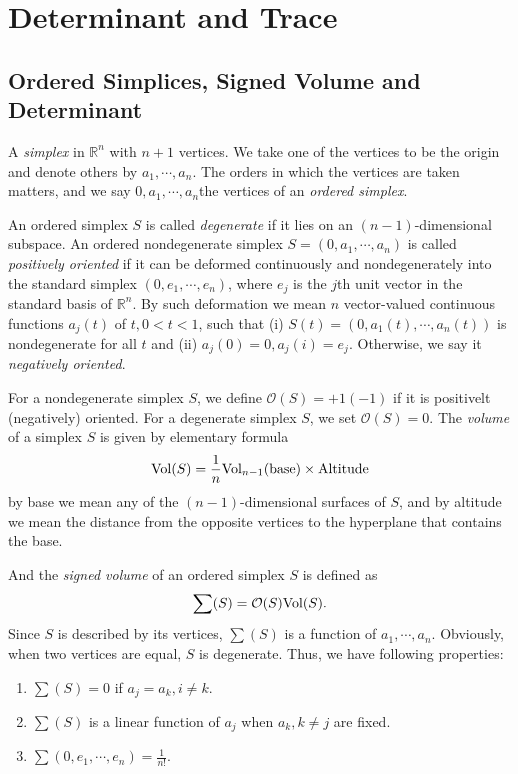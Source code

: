 \documentclass[11pt]{book}
\theoremstyle{definition}
\numberwithin{equation}{chapter}
\begin{document}
\chapter{Determinant and Trace}
\section{Ordered Simplices, Signed Volume and Determinant}
A \emph{simplex} in $\mathbb{R}^n$ with $n+1$ vertices. We take one of the vertices to be the origin and denote others by $a_1,\cdots, a_n$. The orders in which the vertices are taken matters, and we say $0, a_1,\cdots, a_n$the vertices of an \emph{ordered simplex}.

An ordered simplex $S$ is called \emph{degenerate} if it lies on an $(n-1)$-dimensional subspace. An ordered nondegenerate simplex $S = (0, a_1,\cdots, a_n)$ is called \emph{positively oriented} if it can be deformed continuously and nondegenerately into the standard simplex $(0, e_1,\cdots, e_n)$, where $e_j$ is the $j$th unit vector in the standard basis of $\mathbb{R}^n$. By such deformation we mean $n$ vector-valued continuous functions $a_j(t)$ of $t,0 < t < 1$, such that (i) $S(t) = (0,a_1(t),\cdots, a_n(t))$ is nondegenerate for all $t$ and (ii) $a_j(0) = 0, a_j(i) = e_j$. 
Otherwise, we say it \emph{negatively oriented}. 

For a nondegenerate simplex $S$, we define $\mathcal{O}(S) = +1(-1)$ if it is positivelt (negatively) oriented. For a degenerate simplex $S$, we set $\mathcal{O}(S) = 0$. The \emph{volume} of a simplex $S$ is given by elementary formula
\begin{align*}
    {\rm Vol}(S) = \frac{1}{n} {\rm Vol}_{n-1}({\rm base}) \times {\rm Altitude}
\end{align*}
by base we mean any of the $(n-1)$-dimensional surfaces of $S$, and by altitude we mean the distance from the opposite vertices to the hyperplane that contains the base. 

And the \emph{signed volume} of an ordered simplex $S$ is defined as 
\begin{align*}
    \sum (S) = \mathcal{O}(S){\rm Vol}(S).
\end{align*}
Since $S$ is described by its vertices, $\sum (S)$ is a function of $a_1,\cdots,a_n$. Obviously, when two vertices are equal, $S$ is degenerate. Thus, we have following properties:
\begin{enumerate}[label=(\arabic*)]
    \item $\sum (S) = 0$ if $a_j = a_k, i\neq k$.
    \item $\sum (S)$ is a linear function of $a_j$ when $a_k, k\neq j$ are fixed.
    \item $\sum (0,e_1,\cdots,e_n) = \frac{1}{n!}$.
\end{enumerate}
\end{document}
